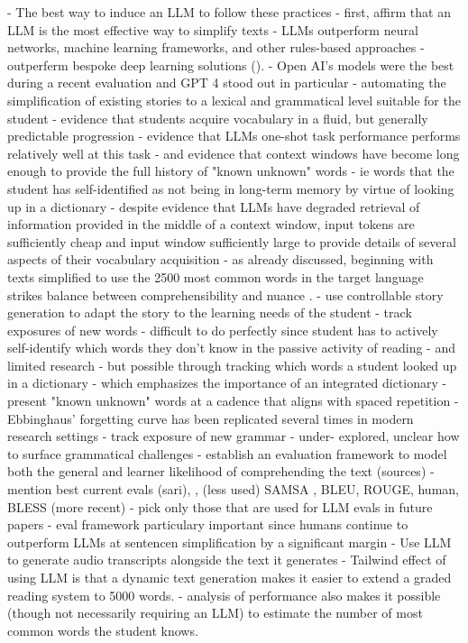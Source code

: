 \documentclass[
	letterpaper, %
]{jdf}
\begin{document}
- The best way to induce an LLM to follow these practices
  - first, affirm that an LLM is the most effective way to simplify texts
    - LLMs outperform neural networks, machine learning frameworks, and other rules-based approaches
      - outperferm bespoke deep learning solutions (\cite{feng2023sentence}).
    - Open AI's models were the best during a recent evaluation \cite{kew2023bless} and GPT 4 stood out in particular \cite{wu2024indepth}
  - automating the simplification of existing stories to a lexical and grammatical level suitable for the student
    - evidence that students acquire vocabulary in a fluid, but generally predictable progression
    - evidence that LLMs one-shot task performance performs relatively well at this task
      - and evidence that context windows have become long enough to provide the full history of "known unknown" words
        - ie words that the student has self-identified as not being in long-term memory by virtue of looking up in a dictionary
        - despite evidence that LLMs have degraded retrieval of information provided in the middle of a context window, input tokens are sufficiently cheap and input window sufficiently large to provide details of several aspects of their vocabulary acquisition \cite{liu2023lost}
    - as already discussed, beginning with texts simplified to use the 2500 most common words in the target language strikes balance between comprehensibility and nuance \cite{nation1992vocabulary}.
  - use controllable story generation to adapt the story to the learning needs of the student 
    - track exposures of new words 
      - difficult to do perfectly since student has to actively self-identify which words they don't know in the passive activity of reading
        - and limited research
        - but possible through tracking which words a student looked up in a dictionary
          - which emphasizes the importance of an integrated dictionary
    - present "known unknown" words at a cadence that aligns with spaced repetition
      - Ebbinghaus' forgetting curve has been replicated several times in modern research settings \cite{Murre2015ReplicationAA}
    - track exposure of new grammar
      - under- explored, unclear how to surface grammatical challenges
  - establish an evaluation framework to model both the general and learner likelihood of comprehending the text (sources)
    - mention best current evals (sari), \cite{xu-etal-2016-optimizing}, (less used) SAMSA \cite{sulem-etal-2018-semantic}, BLEU, ROUGE, human, BLESS (more recent) \cite{kew2023bless}
      - pick only those that are used for LLM evals in future papers
      - eval framework particulary important since humans continue to outperform LLMs at sentencen simplification by a significant margin\cite{kew2023bless}
  - Use LLM to generate audio transcripts alongside the text it generates \cite{Chang2015ImprovingRR}
  - Tailwind effect of using LLM is that a dynamic text generation makes it easier to extend a graded reading system to 5000 words.
    - analysis of performance also makes it possible (though not necessarily requiring an LLM) to estimate the number of most common words the student knows.


\printbibliography{}
\end{document}
